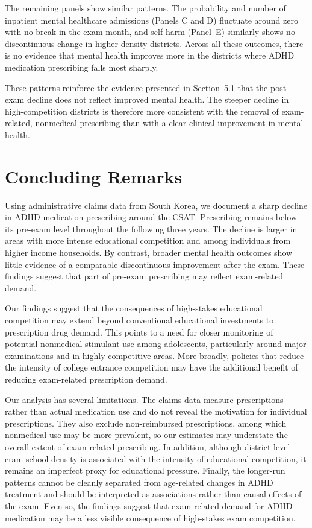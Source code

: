 \documentclass[12pt]{article}
\begin{document}
The remaining panels show similar patterns. The probability and number of inpatient mental healthcare admissions (Panels C and D) fluctuate around zero with no break in the exam month, and self-harm (Panel~E) similarly shows no discontinuous change in higher-density districts. Across all these outcomes, there is no evidence that mental health improves more in the districts where ADHD medication prescribing falls most sharply.

These patterns reinforce the evidence presented in Section~5.1 that the post-exam decline does not reflect improved mental health. The steeper decline in high-competition districts is therefore more consistent with the removal of exam-related, nonmedical prescribing than with a clear clinical improvement in mental health.

\section{Concluding Remarks}

Using administrative claims data from South Korea, we document a sharp decline in ADHD medication prescribing around the CSAT. Prescribing remains below its pre-exam level throughout the following three years. The decline is larger in areas with more intense educational competition and among individuals from higher income households. By contrast, broader mental health outcomes show little evidence of a comparable discontinuous improvement after the exam. These findings suggest that part of pre-exam prescribing may reflect exam-related demand.

Our findings suggest that the consequences of high-stakes educational competition may extend beyond conventional educational investments to prescription drug demand. This points to a need for closer monitoring of potential nonmedical stimulant use among adolescents, particularly around major examinations and in highly competitive areas. More broadly, policies that reduce the intensity of college entrance competition may have the additional benefit of reducing exam-related prescription demand.

Our analysis has several limitations. The claims data measure prescriptions rather than actual medication use and do not reveal the motivation for individual prescriptions. They also exclude non-reimbursed prescriptions, among which nonmedical use may be more prevalent, so our estimates may understate the overall extent of exam-related prescribing. In addition, although district-level cram school density is associated with the intensity of educational competition, it remains an imperfect proxy for educational pressure. Finally, the longer-run patterns cannot be cleanly separated from age-related changes in ADHD treatment and should be interpreted as associations rather than causal effects of the exam. Even so, the findings suggest that exam-related demand for ADHD medication may be a less visible consequence of high-stakes exam competition.
\end{document}
